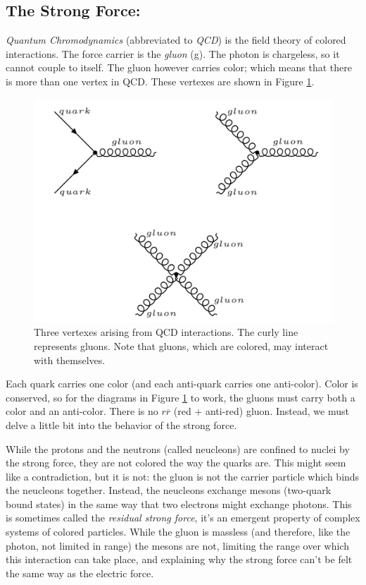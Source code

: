 \subsection{The Strong Force:}
\textit{Quantum Chromodynamics} (abbreviated to \textit{QCD}) is the field theory of colored interactions. The force carrier is the \textit{gluon} (g). The photon is chargeless, so it cannot couple to itself. The gluon however carries color; which means that there is more than one vertex in QCD. These vertexes are shown in Figure \ref{Fig:Intro:Vertex2}.
\begin{figure}[h]
    \centering
        \includegraphics[width=\textwidth]{F1/Vertex2}
        \caption{Three vertexes arising from QCD interactions. The curly line represents gluons. Note that gluons, which are colored, may interact with themselves.}
        \label{Fig:Intro:Vertex2}
\end{figure}

Each quark carries one color (and each anti-quark carries one anti-color). Color is conserved, so for the diagrams in Figure \ref{Fig:Intro:Vertex2} to work, the gluons must carry both a color and an anti-color. There is no $r\overline{r}$ (red + anti-red) gluon. Instead, we must delve a little bit into the behavior of the strong force.

While the protons and the neutrons (called neucleons) are confined to nuclei by the strong force, they are not colored the way the quarks are. This might seem like a contradiction, but it is not: the gluon is not the carrier particle which binds the neucleons together. Instead, the neucleons exchange mesons (two-quark bound states) in the same way that two electrons might exchange photons. This is sometimes called the \textit{residual strong force}, it's an emergent property of complex systems of colored particles. While the gluon is massless (and therefore, like the photon, not limited in range) the mesons are not, limiting the range over which this interaction can take place, and explaining why the strong force can't be felt the same way as the electric force.

